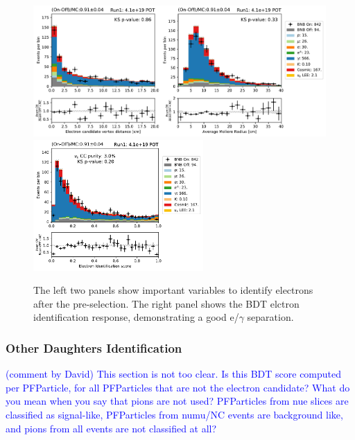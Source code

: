 \begin{figure}
    \centering
    \includegraphics[height=5cm]{NueCCsel/Images/run1/e_cand_dist.pdf}
    \includegraphics[height=5cm]{NueCCsel/Images/run1/pre_e_score.pdf}
    \caption{The left two panels show important variables to identify electrons after the pre-selection. The right panel shows the BDT elctron identification response, demonstrating a good e/$\gamma$ separation.}
    \label{fig:e_cand_dist}
\end{figure}



\subsubsection{Other Daughters Identification}

\textcolor{blue}{(comment by David) This section is not too clear. Is this BDT score computed per PFParticle, for all PFParticles that are not the electron candidate? What do you mean when you say that pions are not used? PFParticles from nue slices are classified as signal-like, PFParticles from numu/NC events are background like, and pions from all events are not classified at all?}

